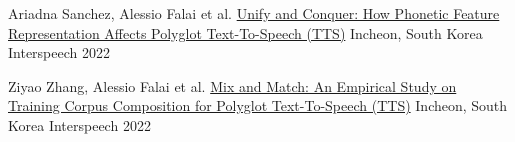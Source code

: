 
\begin{cvpubs}

  \cvpub
    {Ariadna Sanchez, Alessio Falai et al.}
    {\href{https://www.isca-speech.org/archive/interspeech_2022/sanchez22_interspeech.html}{Unify and Conquer: How Phonetic Feature Representation Affects Polyglot Text-To-Speech (TTS)}}
    {Incheon, South Korea}
    {Interspeech 2022}

  \cvpub
    {Ziyao Zhang, Alessio Falai et al.}
    {\href{https://www.isca-speech.org/archive/interspeech_2022/zhang22c_interspeech.html}{Mix and Match: An Empirical Study on Training Corpus Composition for Polyglot Text-To-Speech (TTS)}}
    {Incheon, South Korea}
    {Interspeech 2022}

\end{cvpubs}

